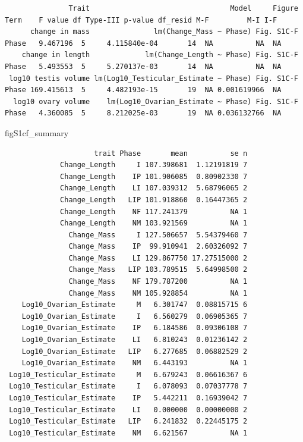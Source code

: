 \documentclass[
  landscape]{article}
\newenvironment{Shaded}{\begin{snugshade}}{\end{snugshade}}
\newcommand{\NormalTok}[1]{#1}
\begin{document}
\begin{verbatim}
               Trait                                 Model     Figure  Term    F value df Type-III p-value df_resid M-F         M-I I-F
      change in mass               lm(Change_Mass ~ Phase) Fig. S1C-F Phase   9.467196  5     4.115840e-04       14  NA          NA  NA
    change in length             lm(Change_Length ~ Phase) Fig. S1C-F Phase   5.493553  5     5.270137e-03       14  NA          NA  NA
 log10 testis volume lm(Log10_Testicular_Estimate ~ Phase) Fig. S1C-F Phase 169.415613  5     4.482193e-15       19  NA 0.001619966  NA
  log10 ovary volume    lm(Log10_Ovarian_Estimate ~ Phase) Fig. S1C-F Phase   4.360085  5     8.212025e-03       19  NA 0.036132766  NA
\end{verbatim}

\begin{Shaded}
\begin{Highlighting}[]
\NormalTok{figS1cf\_summary}
\end{Highlighting}
\end{Shaded}

\begin{verbatim}
                     trait Phase       mean          se n
             Change_Length     I 107.398681  1.12191819 7
             Change_Length    IP 101.906085  0.80902330 7
             Change_Length    LI 107.039312  5.68796065 2
             Change_Length   LIP 101.918860  0.16447365 2
             Change_Length    NF 117.241379          NA 1
             Change_Length    NM 103.921569          NA 1
               Change_Mass     I 127.506657  5.54379460 7
               Change_Mass    IP  99.910941  2.60326092 7
               Change_Mass    LI 129.867750 17.27515000 2
               Change_Mass   LIP 103.789515  5.64998500 2
               Change_Mass    NF 179.787200          NA 1
               Change_Mass    NM 105.928854          NA 1
    Log10_Ovarian_Estimate     M   6.301747  0.08815715 6
    Log10_Ovarian_Estimate     I   6.560279  0.06905365 7
    Log10_Ovarian_Estimate    IP   6.184586  0.09306108 7
    Log10_Ovarian_Estimate    LI   6.810243  0.01236142 2
    Log10_Ovarian_Estimate   LIP   6.277685  0.06882529 2
    Log10_Ovarian_Estimate    NM   6.443193          NA 1
 Log10_Testicular_Estimate     M   6.679243  0.06616367 6
 Log10_Testicular_Estimate     I   6.078093  0.07037778 7
 Log10_Testicular_Estimate    IP   5.442211  0.16939042 7
 Log10_Testicular_Estimate    LI   0.000000  0.00000000 2
 Log10_Testicular_Estimate   LIP   6.241832  0.22445175 2
 Log10_Testicular_Estimate    NM   6.621567          NA 1
\end{verbatim}
\end{document}
